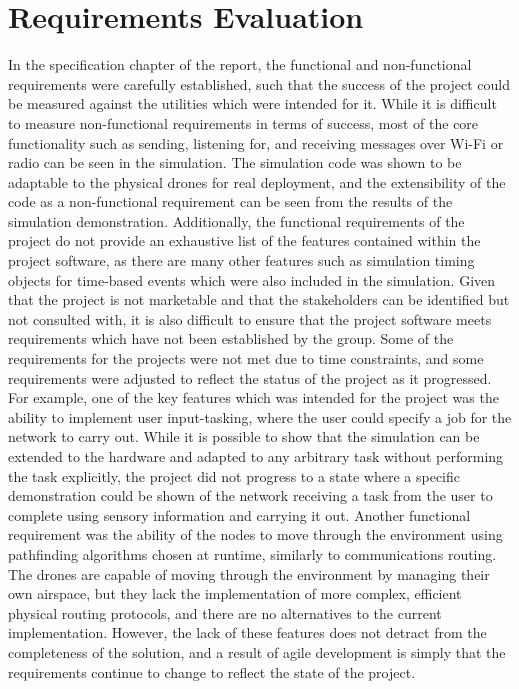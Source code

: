 	\section{Requirements Evaluation}
In the specification chapter of the report, the functional and non-functional requirements were carefully established, such that the success of the project could be measured against the utilities which were intended for it.  While it is difficult to measure non-functional requirements in terms of success, most of the core functionality such as sending, listening for, and receiving messages over Wi-Fi or radio can be seen in the simulation. The simulation code was shown to be adaptable to the physical drones for real deployment, and the extensibility of the code as a non-functional requirement can be seen from the results of the simulation demonstration. Additionally, the functional requirements of the project do not provide an exhaustive list of the features contained within the project software, as there are many other features such as simulation timing objects for time-based events which were also included in the simulation. Given that the project is not marketable and that the stakeholders can be identified but not consulted with, it is also difficult to ensure that the project software meets requirements which have not been established by the group. 
Some of the requirements for the projects were not met due to time constraints, and some requirements were adjusted to reflect the status of the project as it progressed. For example, one of the key features which was intended for the project was the ability to implement user input-tasking, where the user could specify a job for the network to carry out. While it is possible to show that the simulation can be extended to the hardware and adapted to any arbitrary task without performing the task explicitly, the project did not progress to a state where a specific demonstration could be shown of the network receiving a task from the user to complete using sensory information and carrying it out. Another functional requirement was the ability of the nodes to move through the environment using pathfinding algorithms chosen at runtime, similarly to communications routing. The drones are capable of moving through the environment by managing their own airspace, but they lack the implementation of more complex, efficient physical routing protocols, and there are no alternatives to the current implementation. However, the lack of these features does not detract from the completeness of the solution, and a result of agile development is simply that the requirements continue to change to reflect the state of the project.
